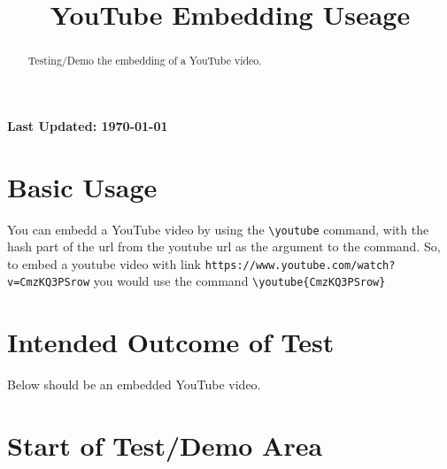 \documentclass{ximera}
\title{YouTube Embedding Useage}
\begin{document}
\begin{abstract}
    Testing/Demo the embedding of a YouTube video.
\end{abstract}
\maketitle

{{\Huge \bfseries Last Updated: \today}} \\


\section{Basic Usage}
You can embedd a YouTube video by using the \verb|\youtube| command, with the hash part of the url from the youtube url as the argument to the command.
So, to embed a youtube video with link \texttt{https://www.youtube.com/watch?v=CmzKQ3PSrow} you would use the command
\verb|\youtube{CmzKQ3PSrow}|

\section{Intended Outcome of Test}
Below should be an embedded YouTube video.

\section{Start of Test/Demo Area}

\hrulefill
\end{document}
